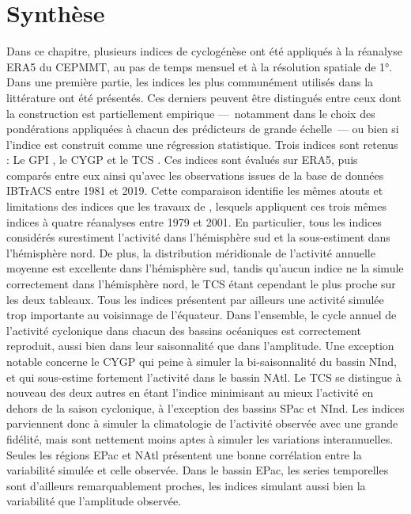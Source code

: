 \documentclass[../main.tex]{subfiles}
\begin{document}
\section{Synthèse}

Dans ce chapitre, plusieurs indices de cyclogénèse ont été appliqués à la réanalyse ERA5 du CEPMMT, au pas de temps mensuel et à la résolution spatiale de
\ang{1}. Dans une première partie, les indices les plus communément utilisés dans la littérature ont été présentés. Ces derniers peuvent être distingués entre
ceux dont la construction est partiellement empirique ---~notamment dans le choix des pondérations appliquées à chacun des prédicteurs de grande échelle~--- ou
bien si l'indice est construit comme une régression statistique. Trois indices sont retenus : Le GPI \parencite{emanuel_tropical_2004}, le CYGP
\parencite{royer_gcm_1998} et le TCS \parencite{tippett_poisson_2011}. Ces indices sont évalués sur ERA5, puis comparés entre eux ainsi qu'avec les observations
issues de la base de données IBTrACS entre \num{1981} et \num{2019}. Cette comparaison identifie les mêmes atouts et limitations des indices que les travaux de
\textcite{menkes_comparison_2012}, lesquels appliquent ces trois mêmes indices à quatre réanalyses entre \num{1979} et \num{2001}. En particulier, tous les
indices considérés surestiment l'activité dans l'hémisphère sud et la sous-estiment dans l'hémisphère nord. De plus, la distribution méridionale de l'activité
annuelle moyenne est excellente dans l'hémisphère sud, tandis qu'aucun indice ne la simule correctement dans l'hémisphère nord, le TCS étant cependant le plus
proche sur les deux tableaux. Tous les indices présentent par ailleurs une activité simulée trop importante au voisinnage de l'équateur. Dans l'ensemble, le
cycle annuel de l'activité cyclonique dans chacun des bassins océaniques est correctement reproduit, aussi bien dans leur saisonnalité que dans l'amplitude. Une
exception notable concerne le CYGP qui peine à simuler la bi-saisonnalité du bassin NInd, et qui sous-estime fortement l'activité dans le bassin NAtl. Le TCS se
distingue à nouveau des deux autres en étant l'indice minimisant au mieux l'activité en dehors de la saison cyclonique, à l'exception des bassins SPac et NInd.
Les indices parviennent donc à simuler la climatologie de l'activité observée avec une grande fidélité, mais sont nettement moins aptes à simuler les variations
interannuelles. Seules les régions EPac et NAtl présentent une bonne corrélation entre la variabilité simulée et celle observée. Dans le bassin EPac, les series
temporelles sont d'ailleurs remarquablement proches, les indices simulant aussi bien la variabilité que l'amplitude observée.
\end{document}
